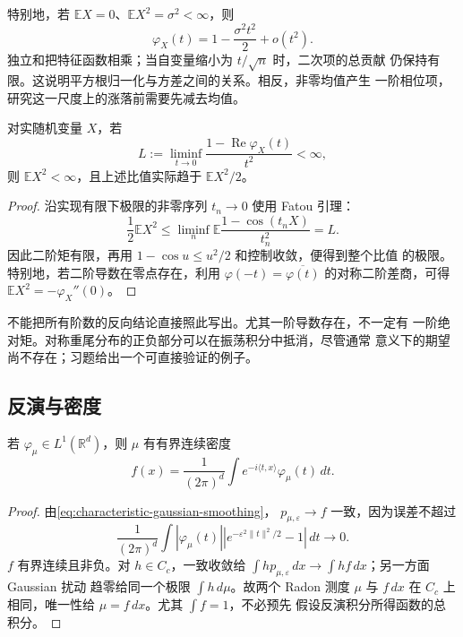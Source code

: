 特别地，若 $\mathbb E X=0$、$\mathbb E X^2=\sigma^2<\infty$，则
\begin{equation}
\label{eq:characteristic-second-order}
 \varphi_X(t)=1-\frac{\sigma^2t^2}{2}+o(t^2).
\end{equation}
独立和把特征函数相乘；当自变量缩小为 $t/\sqrt n$ 时，二次项的总贡献
仍保持有限。这说明平方根归一化与方差之间的关系。相反，非零均值产生
一阶相位项，研究这一尺度上的涨落前需要先减去均值。

\begin{proposition}[从变换检验二阶矩]
\label{prop:characteristic-second-moment-converse}
对实随机变量 $X$，若
\[
 L:=\liminf_{t\to0}\frac{1-\operatorname{Re}\varphi_X(t)}{t^2}<\infty,
\]
则 $\mathbb E X^2<\infty$，且上述比值实际趋于 $\mathbb E X^2/2$。
\end{proposition}

\begin{proof}
沿实现有限下极限的非零序列 $t_n\to0$ 使用 Fatou 引理：
\[
 \frac12\mathbb E X^2
 \le\liminf_n\mathbb E\frac{1-\cos(t_nX)}{t_n^2}=L.
\]
因此二阶矩有限，再用 $1-\cos u\le u^2/2$ 和控制收敛，便得到整个比值
的极限。特别地，若二阶导数在零点存在，利用
$\varphi(-t)=\overline{\varphi(t)}$ 的对称二阶差商，可得
$\mathbb E X^2=-\varphi_X''(0)$。
\end{proof}

不能把所有阶数的反向结论直接照此写出。尤其一阶导数存在，不一定有
一阶绝对矩。对称重尾分布的正负部分可以在振荡积分中抵消，尽管通常
意义下的期望尚不存在；习题给出一个可直接验证的例子。

\subsection{反演与密度}

\begin{theorem}[可积特征函数的反演]
\label{thm:integrable-characteristic-density}
若 $\varphi_\mu\in L^1(\mathbb R^d)$，则 $\mu$ 有有界连续密度
\[
 f(x)=\frac1{(2\pi)^d}\int e^{-i\langle t,x\rangle}\varphi_\mu(t)\,dt.
\]
\end{theorem}

\begin{proof}
由\eqref{eq:characteristic-gaussian-smoothing}，
$p_{\mu,\varepsilon}\to f$ 一致，因为误差不超过
\[
 \frac1{(2\pi)^d}\int|\varphi_\mu(t)|
                 |e^{-\varepsilon^2\|t\|^2/2}-1|\,dt\longrightarrow0.
\]
$f$ 有界连续且非负。对 $h\in C_c$，一致收敛给
$\int h p_{\mu,\varepsilon}\,dx\to\int hf\,dx$；另一方面 Gaussian 扰动
趋零给同一个极限 $\int h\,d\mu$。故两个 Radon 测度 $\mu$ 与 $f\,dx$
在 $C_c$ 上相同，唯一性给 $\mu=f\,dx$。尤其 $\int f=1$，不必预先
假设反演积分所得函数的总积分。
\end{proof}

